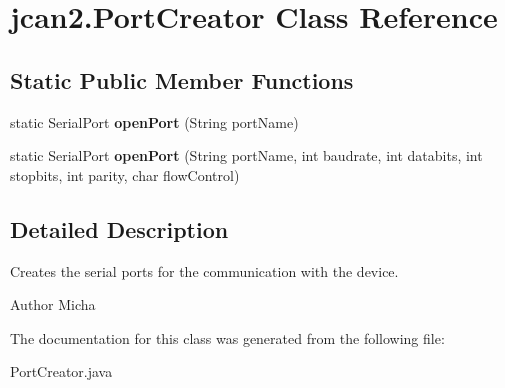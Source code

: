 \hypertarget{classjcan2_1_1_port_creator}{}\section{jcan2.\+Port\+Creator Class Reference}
\label{classjcan2_1_1_port_creator}
\subsection*{Static Public Member Functions}
\begin{DoxyCompactItemize}
\item 
\hypertarget{classjcan2_1_1_port_creator_abb908df72bf8c22991be5694769f2434}{}static Serial\+Port {\bfseries open\+Port} (String port\+Name)\label{classjcan2_1_1_port_creator_abb908df72bf8c22991be5694769f2434}

\item 
\hypertarget{classjcan2_1_1_port_creator_a17ac0942810adcb4c9461f86482e68df}{}static Serial\+Port {\bfseries open\+Port} (String port\+Name, int baudrate, int databits, int stopbits, int parity, char flow\+Control)\label{classjcan2_1_1_port_creator_a17ac0942810adcb4c9461f86482e68df}

\end{DoxyCompactItemize}


\subsection{Detailed Description}
Creates the serial ports for the communication with the device. \begin{DoxyAuthor}{Author}
Micha 
\end{DoxyAuthor}


The documentation for this class was generated from the following file\+:\begin{DoxyCompactItemize}
\item 
Port\+Creator.\+java\end{DoxyCompactItemize}
